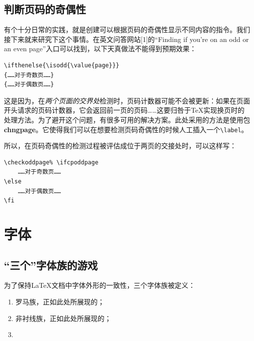 \subsection{判断页码的奇偶性}

有个十分日常的实践，就是创建可以根据页码的奇偶性显示不同内容的指令。我们接下来就来研究下这个事情。在英文问答网站[1]的“Finding if you're on an odd or an even page”入口可以找到，以下天真做法不能得到预期效果：

\begin{dmd}
\begin{verbatim}
\ifthenelse{\isodd{\value{page}}} 
{……对于奇数页……}
{……对于偶数页……}\end{verbatim}
\end{dmd}

这是因为，在\emph{两个页面的交界处}检测时，页码计数器可能不会被更新：如果在页面开头请求的页码计数器，它会返回前一页的页码……这要归咎于\TeX 实现换页时的处理方法。为了避开这个问题，有很多可用的解决方案。此处采用的方法是使用包\textbf{chngpage}。它使得我们可以在想要检测页码奇偶性的时候人工插入一个\verb|\label|。

所以，在页码奇偶性的检测过程被评估成位于两页的交接处时，可以这样写：

\begin{dmd}
\begin{verbatim}
\checkoddpage% \ifcpoddpage
    ……对于奇数页……
\else
    ……对于偶数页……
\fi \end{verbatim}
\end{dmd}

\section{字体}

\subsection{“三个”字体族的游戏}

为了保持\LaTeX 文档中字体外形的一致性，三个字体族被定义：

\begin{enumerate}
    \item 罗马族，正如此处所展现的；
    \item \textsf{非衬线族，正如此处所展现的；}
    \item {}
\end{enumerate}

